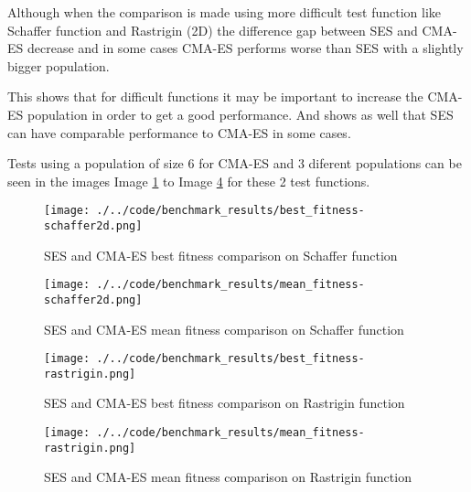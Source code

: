 Although when the comparison is made using more difficult test function like Schaffer function and Rastrigin (2D) the difference gap between SES and CMA-ES decrease and in some cases CMA-ES performs worse than SES with a slightly bigger population.

This shows that for difficult functions it may be important to increase the CMA-ES population in order to get a good performance. And shows as well that SES can have comparable performance to CMA-ES in some cases.

Tests using a population of size 6 for CMA-ES and 3 diferent populations can be seen in the images Image \ref{img:best_fitness-schaffer2d} to Image \ref{img:mean_fitness-rastrigin} for these 2 test functions.

\begin{figure}
  \begin{center}
  \texttt{[image: ./../code/benchmark\_results/best\_fitness-schaffer2d.png]}
  \caption{SES and CMA-ES best fitness comparison on Schaffer function}
  \label{img:best_fitness-schaffer2d}
  \end{center}
\end{figure}

\begin{figure}
  \begin{center}
  \texttt{[image: ./../code/benchmark\_results/mean\_fitness-schaffer2d.png]}
  \caption{SES and CMA-ES mean fitness comparison on Schaffer function}
  \label{img:mean_fitness-schaffer2d}
  \end{center}
\end{figure}

\begin{figure}
  \begin{center}
  \texttt{[image: ./../code/benchmark\_results/best\_fitness-rastrigin.png]}
  \caption{SES and CMA-ES best fitness comparison on Rastrigin function}
  \label{img:best_fitness-rastrigin}
  \end{center}
\end{figure}

\begin{figure}
  \begin{center}
  \texttt{[image: ./../code/benchmark\_results/mean\_fitness-rastrigin.png]}
  \caption{SES and CMA-ES mean fitness comparison on Rastrigin function}
  \label{img:mean_fitness-rastrigin}
  \end{center}
\end{figure}


